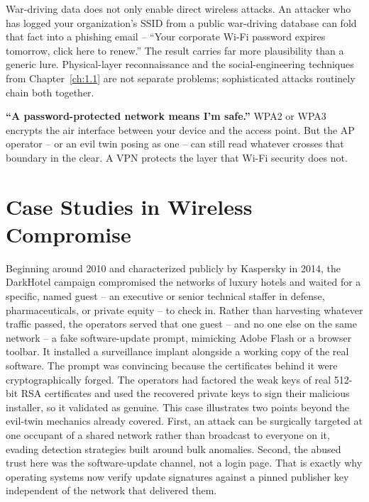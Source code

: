 \begin{example}
War-driving data does not only enable direct wireless attacks. An attacker who has logged your
organization's SSID from a public war-driving database can fold that fact into a phishing email
-- ``Your corporate Wi-Fi password expires tomorrow, click here to renew.'' The result carries far
more plausibility than a generic lure. Physical-layer reconnaissance and the social-engineering
techniques from Chapter~\ref{ch:1.1} are not separate problems; sophisticated attacks routinely
chain both together.
\end{example}

\begin{misconception}
\textbf{``A password-protected network means I'm safe.''} WPA2 or WPA3 encrypts the air
interface between your device and the access point. But the AP operator -- or an evil twin
posing as one -- can still read whatever crosses that boundary in the clear. A VPN protects the
layer that Wi-Fi security does not.
\end{misconception}

\section{Case Studies in Wireless Compromise}

\begin{example}
Beginning around 2010 and characterized publicly by Kaspersky in 2014, the DarkHotel campaign
compromised the networks of luxury hotels and waited for a specific, named guest -- an executive
or senior technical staffer in defense, pharmaceuticals, or private equity -- to check
in. Rather than harvesting whatever traffic passed, the operators served that one
guest -- and no one else on the same network -- a fake software-update prompt, mimicking Adobe
Flash or a browser toolbar. It installed a surveillance implant alongside a working copy of the
real software. The prompt was convincing because the certificates behind it were cryptographically
forged. The operators had factored the weak keys of real 512-bit RSA certificates and used the
recovered private keys to sign their malicious installer, so it validated as genuine. This case
illustrates two points beyond the evil-twin mechanics already covered. First, an attack can be
surgically targeted at one occupant of a shared network rather than broadcast to everyone on it,
evading detection strategies built around bulk anomalies. Second, the abused trust here was the
software-update channel, not a login page. That is exactly why operating systems now verify update
signatures against a pinned publisher key independent of the network that delivered them.
\end{example}

